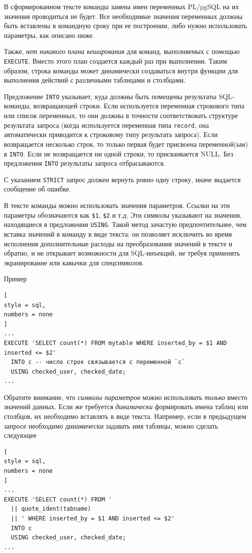 \documentclass[%
	11pt,
	a4paper,
	utf8,
		]{article}
\begin{document}
В сформированном тексте команды замена имен переменных PL/pgSQL на их значения проводиться не будет. Все необходимые значения переменных должны быть вставлены в командную сроку при ее построении, либо нужно использовать параметры, как описано ниже.

Также, \emph{нет никакого плана кеширования} для команд, выполняемых с помощью \texttt{EXECUTE}. Вместо этого план создается каждый раз при выполнении. Таким образом, строка команды может динамически создаваться внутри функции для выполнения действий с различными таблицами и столбцами.

Предложение \texttt{INTO} указывает, куда должны быть помещены результаты SQL-команды, возвращающей строки. Если используется переменная строкового типа или список переменных, то они должны в точности соответствовать структуре результата запроса (когда используется переменная типа \texttt{record}, она автоматически приводится к строковому типу результата запроса). Если возвращается несколько строк, то только первая будет присвоена переменной(ым) в \texttt{INTO}. Если не возвращается ни одной строки, то присваивается NULL. Без предложения \texttt{INTO} результаты запроса отбрасываются.

С указанием \texttt{STRICT} запрос должен вернуть ровно одну строку, иначе выдается сообщение об ошибке.

В тексте команды можно использовать значения параметров. Ссылки на эти параметры обозначаются как \texttt{\$1}, \texttt{\$2} и т.д. Эти символы указывают на значения, находящиеся в предложении \texttt{USING}. Такой метод зачастую предпочтительнее, чем вставка значений в команду в виде текста: он позволяет исключить во время исполнения дополнительные расходы на преобразования значений в тексте и обратно, и не открывает возможности для SQL-инъекций, не требуя применять экранирование или кавычки для спецсимволов.

Пример
\begin{lstlisting}[
style = sql,
numbers = none
]
...
EXECUTE 'SELECT count(*) FROM mytable WHERE inserted_by = $1 AND inserted <= $2'
  INTO c -- число строк связывается с переменной `c`
  USING checked_user, checked_date;
...
\end{lstlisting}

Обратите внимание, что \emph{символы параметров} можно использовать \emph{только} вместо значений данных. Если же требуется \emph{динамически} формировать имена таблиц или столбцов, их необходимо вставлять в виде текста. Например, если в предыдущем запросе необходимо динамически задавать имя таблицы, можно сделать следующее
\begin{lstlisting}[
style = sql,
numbers = none
]
...
EXECUTE 'SELECT count(*) FROM '
  || quote_ident(tabname)
  || ' WHERE inserted_by = $1 AND inserted <= $2'
  INTO c
  USING checked_user, checked_date;
...
\end{lstlisting}
\end{document}

